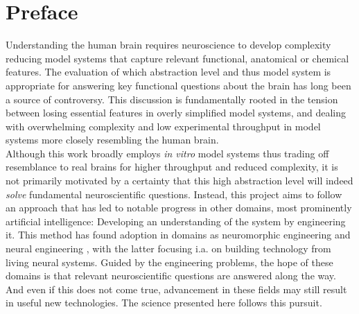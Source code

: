 \section{Preface}
Understanding the human brain requires neuroscience to develop complexity
reducing model systems that capture relevant functional, anatomical or chemical
features. The evaluation of which abstraction level and thus model system is
appropriate for answering key functional questions about the brain has long been
a source of controversy. This discussion is fundamentally rooted in the tension
between losing essential features in overly simplified model systems, and
dealing with overwhelming complexity and low experimental throughput in model
systems more closely resembling the human brain. \\
Although this work broadly employs \textit{in vitro} model systems thus trading
off resemblance to real brains for higher throughput and reduced complexity, it
is not primarily motivated by a certainty that this high abstraction level will
indeed \textit{solve} fundamental neuroscientific questions. Instead, this
project aims to follow an approach that has led to notable progress in other
domains, most prominently artificial intelligence: Developing an understanding
of the system by engineering it. This method has found adoption in domains as
neuromorphic engineering \parencite{neuromorphic} and neural engineering
\parencite{neuroengineering}, with the latter focusing i.a. on building
technology from living neural systems. Guided by the engineering problems, the
hope of these domains is that relevant neuroscientific questions are answered
along the way. And even if this does not come true, advancement in these fields
may still result in useful new technologies. The science presented here follows
this pursuit.\\ 

